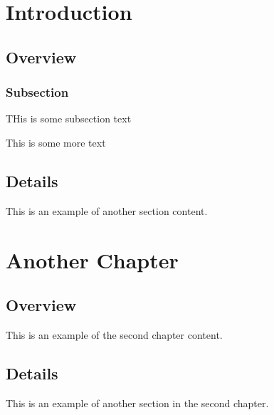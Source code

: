 \documentclass[openany, 11pt]{book}
\begin{document}
\chapter{Introduction}
\section{Overview}
\subsection{Subsection}

THis is some subsection text

\newpage

This is some more text

\section{Details}
This is an example of another section content.

\chapter{Another Chapter}
\section{Overview}
This is an example of the second chapter content.

\section{Details}
This is an example of another section in the second chapter.
\end{document}
